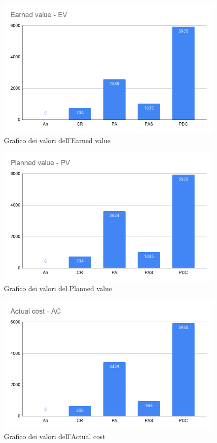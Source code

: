         \begin{figure}[H]
            \centering
            \includegraphics[width=13 cm]{source/sections/images/Earned_value.png}
            \caption{Grafico dei valori dell'Earned value}
        \end{figure}

        \begin{figure}[H]
            \centering
            \includegraphics[width=13 cm]{source/sections/images/planned_value.png}
            \caption{Grafico dei valori del Planned value}
        \end{figure}


        \begin{figure}[H]
            \centering
            \includegraphics[width=13 cm]{source/sections/images/actual_cost.png}
            \caption{Grafico dei valori dell'Actual cost}
        \end{figure}


